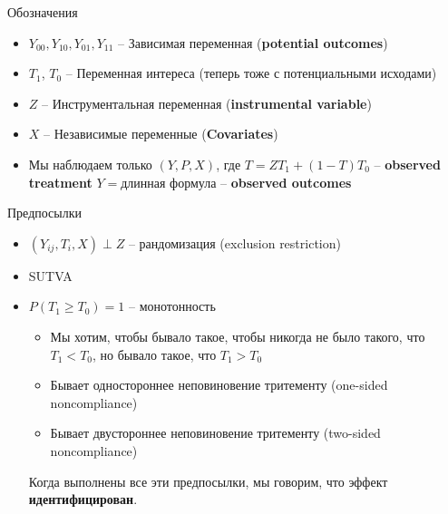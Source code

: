 \begin{frame}{Обозначения} 
\begin{itemize}
    \item $Y_{00}, Y_{10}, Y_{01}, Y_{11}$ -- Зависимая переменная (\textbf{potential outcomes})
    \item $T_1$, $T_0$ -- Переменная интереса (теперь тоже с потенциальными исходами)
    \item $Z$ -- Инструментальная переменная (\textbf{instrumental variable})
    \item $X$ -- Независимые переменные (\textbf{Covariates})
    \item Мы наблюдаем только $(Y, P, X)$, где $T = ZT_1 + (1-T)T_0$ -- \textbf{observed treatment} $Y = \texttt{длинная формула}$ -- \textbf{observed outcomes}
\end{itemize}
\end{frame}

\begin{frame}{Предпосылки}

\begin{itemize}
    \item $(Y_{ij}, T_i, X) \perp Z$ -- рандомизация (exclusion restriction)
    \item SUTVA
    \item<2-> $P(T_1 \geq T_0) = 1$ -- монотонность %
    \begin{itemize}
        \item Мы хотим, чтобы бывало такое, чтобы никогда не было такого, что  $T_1 < T_0$, но бывало такое, что $T_1 > T_0$
        \item Бывает одностороннее неповиновение тритементу (one-sided noncompliance)
        \item Бывает двустороннее неповиновение тритементу (two-sided noncompliance)
    \end{itemize}

Когда выполнены все эти предпосылки, мы говорим, что эффект \textbf{идентифицирован}.
\end{itemize}
\end{frame}


